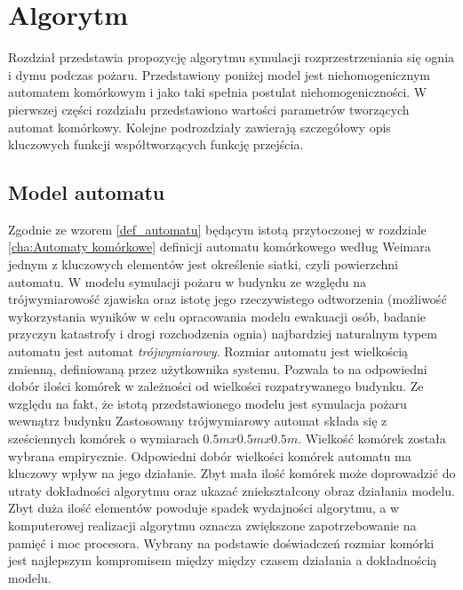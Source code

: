 ﻿%
\chapter{Algorytm}
\label{cha:Algorytm}
Rozdział przedstawia propozycję algorytmu symulacji rozprzestrzeniania się ognia i dymu podczas pożaru.
Przedstawiony poniżej model jest niehomogenicznym automatem komórkowym i jako taki spełnia postulat niehomogeniczności.
W pierwszej części rozdziału przedstawiono wartości parametrów tworzących automat komórkowy. Kolejne podrozdziały 
zawierają szczegółowy opis kluczowych funkcji współtworzących funkcję przejścia.
\section {Model automatu}
Zgodnie ze wzorem \ref{def_automatu} będącym istotą przytoczonej w rozdziale \ref{cha:Automaty komórkowe} definicji automatu komórkowego według Weimara jednym z kluczowych elementów jest określenie siatki, czyli powierzchni automatu. W modelu symulacji pożaru w budynku
ze względu na trójwymiarowość zjawiska oraz istotę jego rzeczywistego odtworzenia (możliwość wykorzystania wyników w celu
opracowania modelu ewakuacji osób, badanie przyczyn katastrofy i drogi rozchodzenia ognia) najbardziej naturalnym typem automatu 
jest automat \textsl {trójwymiarowy}. 
Rozmiar automatu jest wielkością zmienną, definiowaną przez użytkownika systemu. Pozwala to na odpowiedni dobór ilości komórek w zależności od wielkości rozpatrywanego budynku. Ze względu na fakt, że istotą przedstawionego modelu jest symulacja pożaru wewnątrz budynku 
Zastosowany trójwymiarowy automat składa się z sześciennych komórek o wymiarach $0.5m x 0.5m x 0.5m$. Wielkość komórek została wybrana empirycznie. 
Odpowiedni dobór wielkości komórek automatu ma kluczowy wpływ na jego działanie. Zbyt mała ilość komórek może doprowadzić do utraty
dokładności algorytmu oraz ukazać zniekształcony obraz działania modelu. Zbyt duża ilość elementów powoduje spadek wydajności algorytmu, a w komputerowej realizacji algorytmu oznacza zwiększone zapotrzebowanie na pamięć i moc procesora.
Wybrany na podstawie doświadczeń rozmiar komórki jest najlepszym
kompromisem między między czasem działania a dokładnością modelu.

